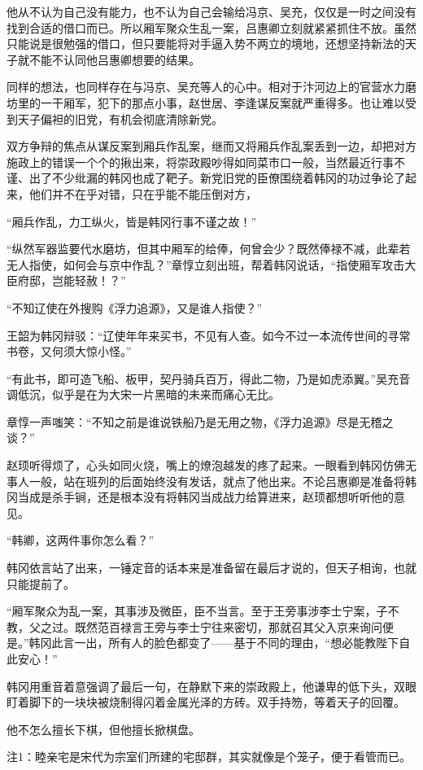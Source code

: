 他从不认为自己没有能力，也不认为自己会输给冯京、吴充，仅仅是一时之间没有找到合适的借口而已。所以厢军聚众生乱一案，吕惠卿立刻就紧紧抓住不放。虽然只能说是很勉强的借口，但只要能将对手逼入势不两立的境地，还想坚持新法的天子就不能不认同他吕惠卿想要的结果。

同样的想法，也同样存在与冯京、吴充等人的心中。相对于汴河边上的官营水力磨坊里的一干厢军，犯下的那点小事，赵世居、李逢谋反案就严重得多。也让难以受到天子偏袒的旧党，有机会彻底清除新党。

双方争辩的焦点从谋反案到厢兵作乱案，继而又将厢兵作乱案丢到一边，却把对方施政上的错误一个个的揪出来，将崇政殿吵得如同菜市口一般，当然最近行事不谨、出了不少纰漏的韩冈也成了靶子。新党旧党的臣僚围绕着韩冈的功过争论了起来，他们并不在乎对错，只在乎能不能压倒对方，

“厢兵作乱，力工纵火，皆是韩冈行事不谨之故！”

“纵然军器监要代水磨坊，但其中厢军的给俸，何曾会少？既然俸禄不减，此辈若无人指使，如何会与京中作乱？”章惇立刻出班，帮着韩冈说话，“指使厢军攻击大臣府邸，岂能轻赦！？”

“不知辽使在外搜购《浮力追源》，又是谁人指使？”

王韶为韩冈辩驳：“辽使年年来买书，不见有人查。如今不过一本流传世间的寻常书卷，又何须大惊小怪。”

“有此书，即可造飞船、板甲，契丹骑兵百万，得此二物，乃是如虎添翼。”吴充音调低沉，似乎是在为大宋一片黑暗的未来而痛心无比。

章惇一声嗤笑：“不知之前是谁说铁船乃是无用之物，《浮力追源》尽是无稽之谈？”

赵顼听得烦了，心头如同火烧，嘴上的燎泡越发的疼了起来。一眼看到韩冈仿佛无事人一般，站在班列的后面始终没有发话，就点了他出来。不论吕惠卿是准备将韩冈当成是杀手锏，还是根本没有将韩冈当成战力给算进来，赵顼都想听听他的意见。

“韩卿，这两件事你怎么看？”

韩冈依言站了出来，一锤定音的话本来是准备留在最后才说的，但天子相询，也就只能提前了。

“厢军聚众为乱一案，其事涉及微臣，臣不当言。至于王旁事涉李士宁案，子不教，父之过。既然范百禄言王旁与李士宁往来密切，那就召其父入京来询问便是。”韩冈此言一出，所有人的脸色都变了——基于不同的理由，“想必能教陛下自此安心！”

韩冈用重音着意强调了最后一句，在静默下来的崇政殿上，他谦卑的低下头，双眼盯着脚下的一块块被烧制得闪着金属光泽的方砖。双手持笏，等着天子的回覆。

他不怎么擅长下棋，但他擅长掀棋盘。

注1：睦亲宅是宋代为宗室们所建的宅邸群，其实就像是个笼子，便于看管而已。

